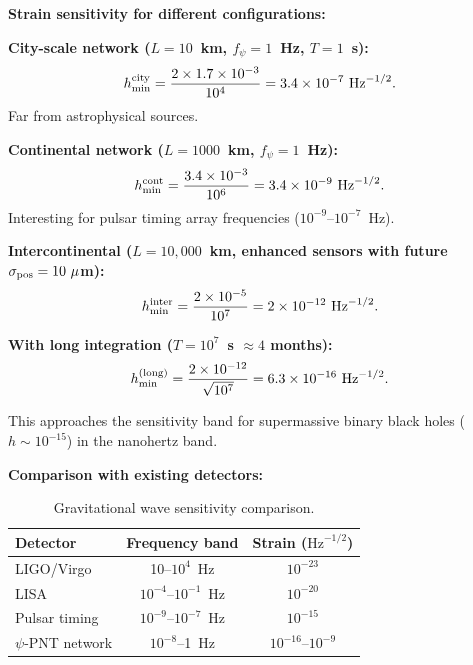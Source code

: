 \documentclass[aps,prd,twocolumn,superscriptaddress,nofootinbib]{revtex4-2}
\begin{document}
\textbf{Strain sensitivity for different configurations:}

\textbf{City-scale network ($L = 10$~km, $f_\psi = 1$~Hz, $T = 1$~s):}
\begin{equation}
h_{\rm min}^{\rm city} = \frac{2\times 1.7\times10^{-3}}{10^4}
= 3.4\times10^{-7}~\text{Hz}^{-1/2}.
\end{equation}
Far from astrophysical sources.

\textbf{Continental network ($L = 1000$~km, $f_\psi = 1$~Hz):}
\begin{equation}
h_{\rm min}^{\rm cont} = \frac{3.4\times10^{-3}}{10^6}
= 3.4\times10^{-9}~\text{Hz}^{-1/2}.
\end{equation}
Interesting for pulsar timing array frequencies ($10^{-9}$--$10^{-7}$~Hz).

\textbf{Intercontinental ($L = 10{,}000$~km, enhanced sensors with
future $\sigma_{\rm pos} = 10~\mu$m):}
\begin{equation}
h_{\rm min}^{\rm inter} = \frac{2\times10^{-5}}{10^7}
= 2\times10^{-12}~\text{Hz}^{-1/2}.
\end{equation}

\textbf{With long integration ($T = 10^7$~s $\approx 4$ months):}
\begin{equation}
h_{\rm min}^{\rm (long)} = \frac{2\times10^{-12}}{\sqrt{10^7}}
= 6.3\times10^{-16}~\text{Hz}^{-1/2}.
\end{equation}

This approaches the sensitivity band for
supermassive binary black holes ($h \sim 10^{-15}$) in the
nanohertz band.

\textbf{Comparison with existing detectors:}

\begin{table}[h]
\caption{Gravitational wave sensitivity comparison.}
\begin{ruledtabular}
\begin{tabular}{lcc}
Detector & Frequency band & Strain ($\text{Hz}^{-1/2}$) \\
\hline
LIGO/Virgo & 10--$10^4$~Hz & $10^{-23}$ \\
LISA & $10^{-4}$--$10^{-1}$~Hz & $10^{-20}$ \\
Pulsar timing & $10^{-9}$--$10^{-7}$~Hz & $10^{-15}$ \\
$\psi$-PNT network & $10^{-8}$--1~Hz & $10^{-16}$--$10^{-9}$ \\
\end{tabular}
\end{ruledtabular}
\end{table}
\end{document}

